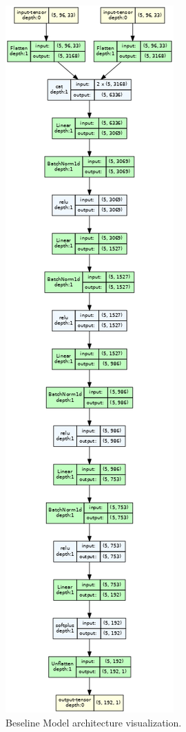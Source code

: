 \begin{figure}[H]
	\centering
	\includegraphics[height=.9\textheight]{chapters/3_models/imgs/ufcnmodel.png}
	\caption{Beseline Model architecture visualization.}\label{fig:baselinemodelarch}
\end{figure}

